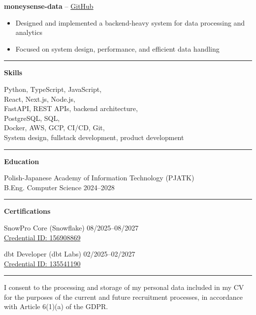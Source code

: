 \documentclass[11pt,a4paper]{article}
\begin{document}
\textbf{moneysense-data} -- \href{https://github.com/joachimhodana/moneysense-data}{GitHub}
\begin{itemize}
\item Designed and implemented a backend-heavy system for data processing and analytics
\item Focused on system design, performance, and efficient data handling
\end{itemize}

\rule{\textwidth}{0.5pt}

\textbf{Skills}

Python, TypeScript, JavaScript, \\
React, Next.js, Node.js, \\
FastAPI, REST APIs, backend architecture, \\
PostgreSQL, SQL, \\
Docker, AWS, GCP, CI/CD, Git, \\
System design, fullstack development, product development

\rule{\textwidth}{0.5pt}

\textbf{Education}

Polish-Japanese Academy of Information Technology (PJATK) \\
B.Eng. Computer Science \hfill 2024--2028

\rule{\textwidth}{0.5pt}

\textbf{Certifications}

SnowPro Core (Snowflake) \hfill 08/2025--08/2027 \\
\href{https://achieve.snowflake.com/31ea4326-9e88-4148-a8b5-20326f786e50}{Credential ID: 156908869}

dbt Developer (dbt Labs) \hfill 02/2025--02/2027 \\
\href{https://credentials.getdbt.com/75e67339-1260-4bb4-bb4e-efbb9c0bc774}{Credential ID: 135541190}

\rule{\textwidth}{0.5pt}

{\small
I consent to the processing and storage of my personal data included in my CV for the purposes of the current and future recruitment processes, in accordance with Article 6(1)(a) of the GDPR.
}
\end{document}
